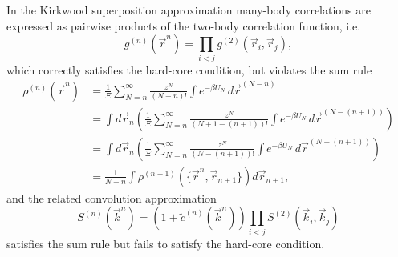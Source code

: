 In the Kirkwood superposition approximation \cite{KirkwoodJCP1935} many-body correlations are expressed as pairwise products of the two-body correlation function, i.e.
\begin{equation}
  g^{(n)}(\vec{r}^n) =
  \prod_{i < j} g^{(2)}(\vec{r}_i, \vec{r}_j),
\end{equation}
which correctly satisfies the hard-core condition, but violates the sum rule
\begin{equation}
  \begin{aligned}
    \rho^{(n)}(\vec{r}^n) &=
    \frac{1}{\Xi} \sum_{N=n}^\infty \frac{z^N}{(N-n)!} \int e^{-\beta U_N} \, d\vec{r}^{(N-n)} \\
    &=
    \int d\vec{r}_n \left(
    \frac{1}{\Xi} \sum_{N=n}^\infty \frac{z^N}{(N+1 - (n+1))!} \int e^{-\beta U_N} \, d\vec{r}^{(N-(n+1))}
    \right) \\
    &=
    \int d\vec{r}_n \left(
    \frac{1}{\Xi} \sum_{N=n}^\infty \frac{z^N}{(N - (n+1))!} \int e^{-\beta U_N} \, d\vec{r}^{(N-(n+1))}
    \right) \\
    &=
    \frac{1}{N-n}
    \int \rho^{(n+1)}(\{\vec{r}^n, \vec{r}_{n+1}\}) d\vec{r}_{n+1},
  \end{aligned}
\end{equation}
and the related convolution approximation \cite{JacksonRMP1962,IchimaruPRA1970,BarratMP1988}%
\begin{equation}
  S^{(n)}(\vec{k}^n) =
  (1 + \tilde{c}^{(n)}(\vec{k}^n))
  \prod_{i < j} S^{(2)}(\vec{k}_i, \vec{k}_j)
\end{equation}
satisfies the sum rule but fails to satisfy the hard-core condition.


